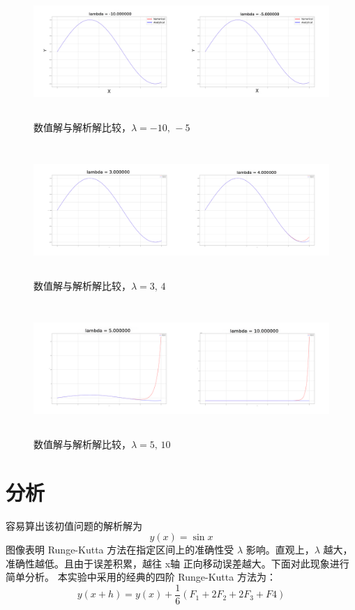 \documentclass{ctexart}
\begin{document}
\begin{figure}[H]
	\centering
	\includegraphics[width = 15cm, height = 5cm]{Figure-1.png}
	\caption{数值解与解析解比较，$\lambda = -10,\,-5$} \label{figure-1.label}
\end{figure}
\begin{figure}[H]
	\centering
	\includegraphics[width = 15cm, height = 5cm]{Figure-2.png}
	\caption{数值解与解析解比较，$\lambda = 3,\,4$} \label{figure-2.label}
\end{figure}
	\begin{figure}[H]
	\centering
	\includegraphics[width = 15cm, height = 5cm]{Figure-3.png}
	\caption{数值解与解析解比较，$\lambda = 5,\,10$} \label{figure-3.label}
\end{figure}


\section*{分析}
	容易算出该初值问题的解析解为
	\begin{equation}
		y(x) = \sin x
	\end{equation}
	图像表明 Runge-Kutta 方法在指定区间上的准确性受 $\lambda$ 影响。直观上，$\lambda$ 越大，准确性越低。且由于误差积累，越往 x轴 正向移动误差越大。下面对此现象进行简单分析。
	本实验中采用的经典的四阶 Runge-Kutta 方法为：
	\begin{equation}
		y(x + h) = y(x) + \dfrac{1}{6} (F_1 + 2 F_2 + 2 F_3 + F4)
	\end{equation}
	
\end{document}
